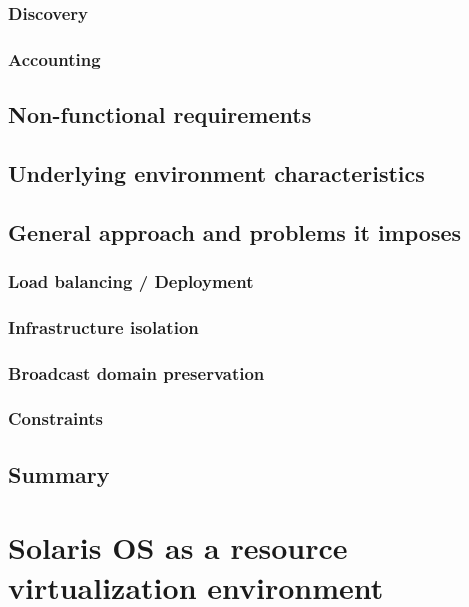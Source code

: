 \documentclass[11pt]{book}
\begin{document}
      \subsection{Discovery}

      \subsection{Accounting}  %


    \section{Non-functional requirements}

    \section{Underlying environment characteristics}

    \section{General approach and problems it imposes}

      \subsection{Load balancing / Deployment}

      \subsection{Infrastructure isolation}

      \subsection{Broadcast domain preservation}

      \subsection{Constraints}


    \section*{Summary}


  \chapter{Solaris OS as a resource virtualization environment}
\end{document}
